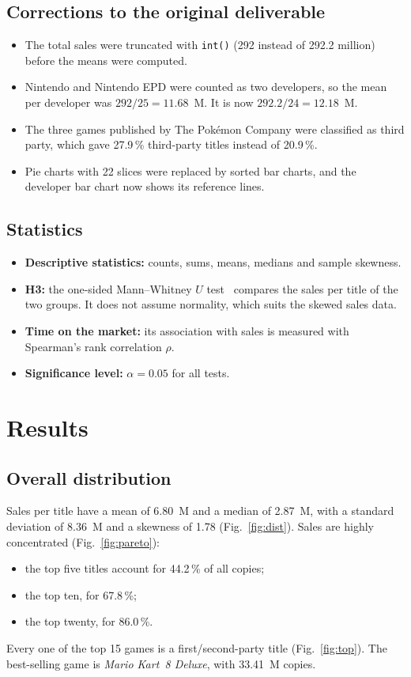 \documentclass[conference]{IEEEtran}
\begin{document}
\subsection{Corrections to the original deliverable}
\begin{itemize}
  \item The total sales were truncated with \texttt{int()} (292 instead of 292.2 million) before the means were computed.
  \item Nintendo and Nintendo EPD were counted as two developers, so the mean per developer was $292/25 = 11.68$~M. It is now $292.2/24 = 12.18$~M.
  \item The three games published by The Pokémon Company were classified as third party, which gave 27.9\,\% third-party titles instead of 20.9\,\%.
  \item Pie charts with 22 slices were replaced by sorted bar charts, and the developer bar chart now shows its reference lines.
\end{itemize}

\subsection{Statistics}
\begin{itemize}
  \item \textbf{Descriptive statistics:} counts, sums, means, medians and sample skewness.
  \item \textbf{H3:} the one-sided Mann--Whitney $U$ test~\cite{mw} compares the sales per title of the two groups. It does not assume normality, which suits the skewed sales data.
  \item \textbf{Time on the market:} its association with sales is measured with Spearman's rank correlation $\rho$.
  \item \textbf{Significance level:} $\alpha = 0.05$ for all tests.
\end{itemize}

\section{Results}

\subsection{Overall distribution}
Sales per title have a mean of 6.80~M and a median of 2.87~M, with a standard deviation of 8.36~M and a skewness of 1.78 (Fig.~\ref{fig:dist}). Sales are highly concentrated (Fig.~\ref{fig:pareto}):
\begin{itemize}
  \item the top five titles account for 44.2\,\% of all copies;
  \item the top ten, for 67.8\,\%;
  \item the top twenty, for 86.0\,\%.
\end{itemize}
Every one of the top 15 games is a first/second-party title (Fig.~\ref{fig:top}). The best-selling game is \emph{Mario Kart~8 Deluxe}, with 33.41~M copies.
\end{document}
